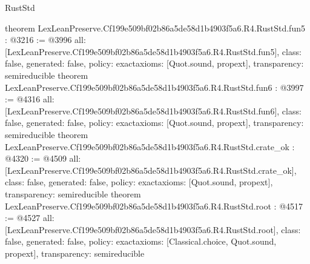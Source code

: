 \begin{lexlean}{RustStd}
\begin{coremodule}
{}
theorem LexLeanPreserve.Cf199e509bf02b86a5de58d1b4903f5a6.R4.RustStd.fun5 : @3216 := @3996 {
  all: [LexLeanPreserve.Cf199e509bf02b86a5de58d1b4903f5a6.R4.RustStd.fun5],
  class: false,
  generated: false,
  policy: exact{axioms: [Quot.sound, propext]},
  transparency: semireducible
}
theorem LexLeanPreserve.Cf199e509bf02b86a5de58d1b4903f5a6.R4.RustStd.fun6 : @3997 := @4316 {
  all: [LexLeanPreserve.Cf199e509bf02b86a5de58d1b4903f5a6.R4.RustStd.fun6],
  class: false,
  generated: false,
  policy: exact{axioms: [Quot.sound, propext]},
  transparency: semireducible
}
theorem LexLeanPreserve.Cf199e509bf02b86a5de58d1b4903f5a6.R4.RustStd.crate_ok : @4320 := @4509 {
  all: [LexLeanPreserve.Cf199e509bf02b86a5de58d1b4903f5a6.R4.RustStd.crate_ok],
  class: false,
  generated: false,
  policy: exact{axioms: [Quot.sound, propext]},
  transparency: semireducible
}
theorem LexLeanPreserve.Cf199e509bf02b86a5de58d1b4903f5a6.R4.RustStd.root : @4517 := @4527 {
  all: [LexLeanPreserve.Cf199e509bf02b86a5de58d1b4903f5a6.R4.RustStd.root],
  class: false,
  generated: false,
  policy: exact{axioms: [Classical.choice, Quot.sound, propext]},
  transparency: semireducible
}


\end{coremodule}
\end{lexlean}
